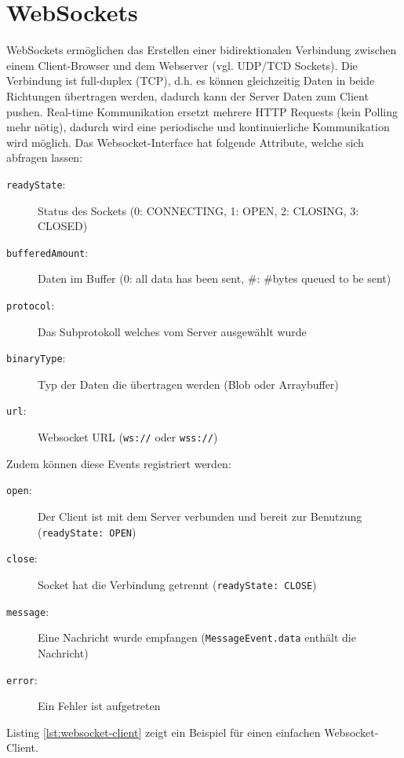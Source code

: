 \section{WebSockets}

WebSockets ermöglichen das Erstellen einer bidirektionalen Verbindung zwischen einem Client-Browser und dem Webserver (vgl. UDP/TCD Sockets). Die Verbindung ist full-duplex (TCP), d.h. es können gleichzeitig Daten in beide Richtungen übertragen werden, dadurch kann der Server Daten zum Client pushen. Real-time Kommunikation ersetzt mehrere HTTP Requests (kein Polling mehr nötig), dadurch wird eine periodische und kontinuierliche Kommunikation wird möglich. Das Websocket-Interface hat folgende Attribute, welche sich abfragen lassen:
\begin{description}
	\item[\texttt{readyState}:] Status des Sockets (0: CONNECTING, 1: OPEN, 2: CLOSING, 3: CLOSED)
	\item[\texttt{bufferedAmount}:] Daten im Buffer (0: all data has been sent, \#: \#bytes queued to be sent)
	\item[\texttt{protocol}:] Das Subprotokoll welches vom Server ausgewählt wurde
	\item[\texttt{binaryType}:] Typ der Daten die übertragen werden (Blob oder Arraybuffer)
	\item[\texttt{url}:] Websocket URL (\verb|ws://| oder \verb|wss://|)
\end{description}
Zudem können diese Events registriert werden:
\begin{description}
	\item[\texttt{open}:] Der Client ist mit dem Server verbunden und bereit zur Benutzung (\verb|readyState: OPEN|)
	\item[\texttt{close}:] Socket hat die Verbindung getrennt (\verb|readyState: CLOSE|)
	\item[\texttt{message}:] Eine Nachricht wurde empfangen (\verb|MessageEvent.data| enthält die Nachricht)
	\item[\texttt{error}:] Ein Fehler ist aufgetreten
\end{description}
Listing \ref{lst:websocket-client} zeigt ein Beispiel für einen einfachen Websocket-Client.


